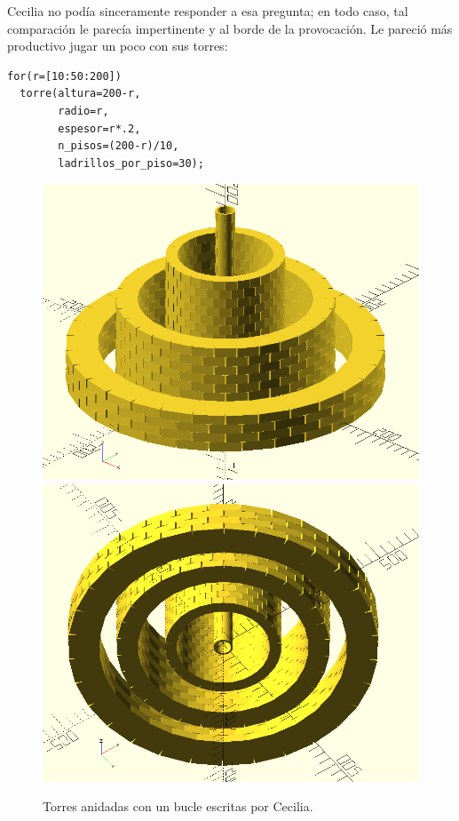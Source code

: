 Cecilia no podía sinceramente responder a esa pregunta; en todo caso,
tal comparación le parecía impertinente y al borde de la provocación. Le
pareció más productivo jugar un poco con sus torres:

\begin{lstlisting}
for(r=[10:50:200])
  torre(altura=200-r,
        radio=r,
        espesor=r*.2,
        n_pisos=(200-r)/10,
        ladrillos_por_piso=30);
\end{lstlisting}


\begin{figure}[ht]
  \centering
  \includegraphics[width=.49\textwidth]{imagenes/torres-anidadas-1}\hfill
    \includegraphics[width=.49\textwidth]{imagenes/torres-anidadas-2}    
    \caption{Torres anidadas con un bucle escritas por Cecilia.}
  \iftoggle{libro}{\vspace{128in}}{}
    \label{fig:torres-anidadas}
  \end{figure}


